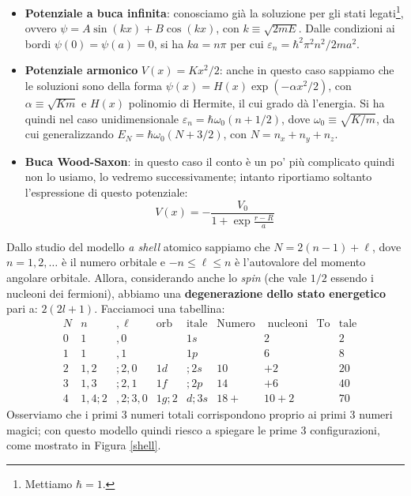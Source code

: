 \begin{itemize}
    \item \textbf{Potenziale a buca infinita}: conosciamo già la soluzione per gli stati legati\footnote{Mettiamo $\hbar=1$.}, ovvero $\psi = A \sin (kx) + B \cos (kx)$, con $k\equiv \sqrt{2mE}$. Dalle condizioni ai bordi $\psi(0)=\psi(a)=0$, si ha $ka = n\pi$ per cui $\varepsilon_n = \hbar^2 \pi^2  n^2 / 2ma^2$.
    \item \textbf{Potenziale armonico} $V(x)=Kx^2/2$: anche in questo caso sappiamo che le soluzioni sono della forma $\psi(x) = H(x)\exp{(-\alpha x^2/2)}$, con $\alpha \equiv \sqrt{Km}$ e $H(x)$ polinomio di Hermite, il cui grado dà l'energia. Si ha quindi nel caso unidimensionale $\varepsilon_n = \hbar \omega_0 (n+1/2)$, dove $\omega_0 \equiv \sqrt{K/m}$, da cui generalizzando $E_N= \hbar \omega_0 (N+3/2)$, con $N= n_x+n_y+n_z$.
    \item \textbf{Buca Wood-Saxon}: in questo caso il conto è un po' più complicato quindi non lo usiamo, lo vedremo successivamente; intanto riportiamo soltanto l'espressione di questo potenziale:
    $$V(x) = - \frac{V_0}{1+\exp{\frac{r-R}{a}}}$$
\end{itemize}
\noindent Dallo studio del modello \textit{a shell} atomico sappiamo che $N = 2(n-1)+\ell$, dove $n=1,2,\dots$ è il numero orbitale e $-n\leq\ell\leq n$ è l'autovalore del momento angolare orbitale. Allora, considerando anche lo \textit{spin} (che vale $1/2$ essendo i nucleoni dei fermioni), abbiamo una \textbf{degenerazione dello stato energetico} pari a: $2(2l+1)$. Facciamoci una tabellina:
\begin{displaymath}
\begin{aligned}
&N & n&,\ell & \text{orb}&\text{itale} & \text{Numero}&\text{ nucleoni} & \text{To}&\text{tale}\\
&0 & 1&,0 & &1s & &2 & &2   \\
&1 & 1&,1 & &1p & &6 & &8   \\
&2 & 1,2&;2,0 & 1d&;2s & 10&+2 & &20 \\
&3 & 1,3&;2,1 & 1f&;2p & 14&+6 & &40   \\
&4 & 1,4;2&,2;3,0 & 1g;2&d;3s & 18+&10+2 & &70
\end{aligned}
\end{displaymath}
Osserviamo che i primi 3 numeri totali corrispondono proprio ai primi 3 numeri magici; con questo modello quindi riesco a spiegare le prime 3 configurazioni, come mostrato in Figura \ref{shell}.
